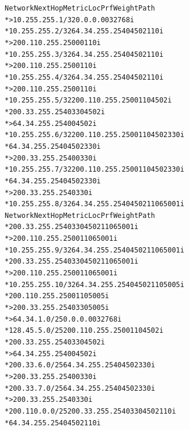 \documentclass[12pt,twoside,a4paper]{report}
\begin{document}
{\begin{small}
\begin{alltt}
   Network          Next Hop            Metric LocPrf Weight Path
*> 10.255.255.1/32  0.0.0.0                  0         32768 i
*  10.255.255.2/32  64.34.255.254                          0 4502 110 i
*>                  200.110.255.250          0             0 110 i
*  10.255.255.3/32  64.34.255.254                          0 4502 110 i
*>                  200.110.255.250                        0 110 i
*  10.255.255.4/32  64.34.255.254                          0 4502 110 i
*>                  200.110.255.250                        0 110 i
*  10.255.255.5/32  200.110.255.250                        0 110 4502 i
*                   200.33.255.254                         0 330 4502 i
*>                  64.34.255.254            0             0 4502 i
*  10.255.255.6/32  200.110.255.250                        0 110 4502 330 i
*                   64.34.255.254                          0 4502 330 i
*>                  200.33.255.254           0             0 330 i
*  10.255.255.7/32  200.110.255.250                        0 110 4502 330 i
*                   64.34.255.254                          0 4502 330 i
*>                  200.33.255.254                         0 330 i
*  10.255.255.8/32  64.34.255.254                          0 4502 110 65001 i
   Network          Next Hop            Metric LocPrf Weight Path
*                   200.33.255.254                         0 330 4502 110 65001 i
*>                  200.110.255.250                        0 110 65001 i
*  10.255.255.9/32  64.34.255.254                          0 4502 110 65001 i
*                   200.33.255.254                         0 330 4502 110 65001 i
*>                  200.110.255.250                        0 110 65001 i
*  10.255.255.10/32 64.34.255.254                          0 4502 110 5005 i
*                   200.110.255.250                        0 110 5005 i
*>                  200.33.255.254                         0 330 5005 i
*> 64.34.1.0/25     0.0.0.0                  0         32768 i
*  128.45.5.0/25    200.110.255.250                        0 110 4502 i
*                   200.33.255.254                         0 330 4502 i
*>                  64.34.255.254            0             0 4502 i
*  200.33.6.0/25    64.34.255.254                          0 4502 330 i
*>                  200.33.255.254           0             0 330 i
*  200.33.7.0/25    64.34.255.254                          0 4502 330 i
*>                  200.33.255.254                         0 330 i
*  200.110.0.0/25   200.33.255.254                         0 330 4502 110 i
*                   64.34.255.254                          0 4502 110 i

\end{alltt}
\end{small}}
\end{document}
